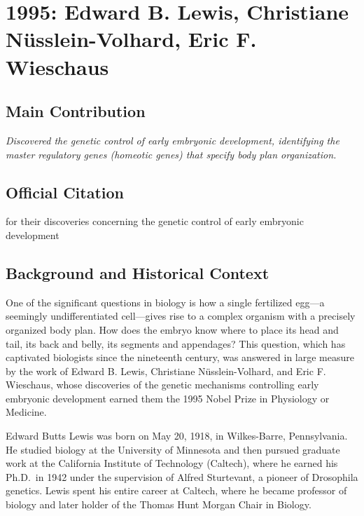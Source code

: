 \chapter[1995 --- Lewis et al.]{1995: Edward B. Lewis, Christiane N\"usslein-Volhard, Eric F. Wieschaus}
\label{ch:1995_Lewis}

\section*{Main Contribution}

\textit{Discovered the genetic control of early embryonic development, identifying the master regulatory genes (homeotic genes) that specify body plan organization.}\cite{nobel-1995,lecture-1995}

\section{Official Citation}

for their discoveries concerning the genetic control of early embryonic development

\section{Background and Historical Context}

One of the significant questions in biology is how a single fertilized egg---a seemingly undifferentiated cell---gives rise to a complex organism with a precisely organized body plan. How does the embryo know where to place its head and tail, its back and belly, its segments and appendages? This question, which has captivated biologists since the nineteenth century, was answered in large measure by the work of Edward B. Lewis, Christiane N\"usslein-Volhard, and Eric F. Wieschaus, whose discoveries of the genetic mechanisms controlling early embryonic development earned them the 1995 Nobel Prize in Physiology or Medicine.

Edward Butts Lewis was born on May 20, 1918, in Wilkes-Barre, Pennsylvania. He studied biology at the University of Minnesota and then pursued graduate work at the California Institute of Technology (Caltech), where he earned his Ph.D.\ in 1942 under the supervision of Alfred Sturtevant, a pioneer of Drosophila genetics. Lewis spent his entire career at Caltech, where he became professor of biology and later holder of the Thomas Hunt Morgan Chair in Biology.

